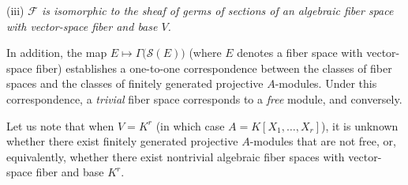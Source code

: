 \label{fac:II:4:no:50:cor:iii}
\par\noindent(iii) \textit{$\mathcal{F}$ is isomorphic to the sheaf of germs of sections
of an algebraic fiber space with vector-space fiber and base $V$.}

\label{fac:II:4:no:50:correspondence}
In addition, the map
$E\longmapsto\Gamma\bigl(\mathcal{S}(E)\bigr)$ (where $E$ denotes a fiber
space with vector-space fiber) establishes a one-to-one correspondence
between the classes of fiber spaces and the classes of finitely generated
projective $A$-modules. Under this correspondence, a \textit{trivial} fiber
space corresponds to a \textit{free} module, and conversely.

\label{fac:II:4:no:50:historical-question}
Let us note that when $V=K^r$ (in which case
$A=K[X_1,\ldots,X_r]$), it is unknown whether there exist finitely generated
projective $A$-modules that are not free, or, equivalently, whether there
exist nontrivial algebraic fiber spaces with vector-space fiber and base
$K^r$.
